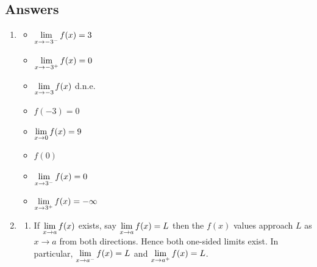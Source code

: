 \newpage

\subsection{Answers}

\begin{enumerate}

\item  \begin{multicols}{4} \begin{itemize} \item $\displaystyle{\lim_{x \rightarrow -3^{-}} f(x) = 3}$

\item $\displaystyle{\lim_{x \rightarrow -3^{+}} f(x) = 0}$

\item $\displaystyle{\lim_{x \rightarrow -3} f(x)}$ d.n.e.

\item $f(-3) = 0$

\end{itemize}

\end{multicols}

\bigskip

\begin{multicols}{4}

\begin{itemize}

\item $\displaystyle{\lim_{x \rightarrow 0} f(x) = 9}$

\item  $f(0)$

\item $\displaystyle{\lim_{x \rightarrow 3^{-}} f(x) = 0}$

\item $\displaystyle{\lim_{x \rightarrow 3^{+}} f(x) = -\infty}$
\end{itemize}

\end{multicols}

\bigskip


\item  \begin{enumerate}  \item  If $\displaystyle{\lim_{x \rightarrow a} f(x)}$ exists, say $\displaystyle{\lim_{x \rightarrow a} f(x) = L}$ then the $f(x)$ values approach  $L$  as $x \rightarrow a$ from both directions.  Hence both one-sided limits exist.  In particular,  $\displaystyle{\lim_{x \rightarrow a^{-}} f(x) = L}$ and $\displaystyle{\lim_{x \rightarrow a^{+}} f(x) = L}$.


\end{enumerate}
\end{enumerate}
